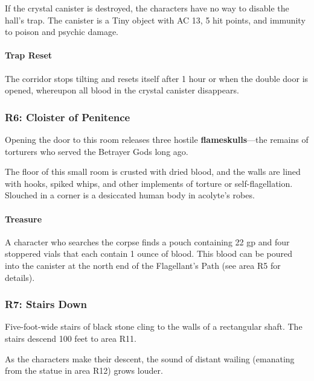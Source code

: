 \documentclass[letterpaper, 11pt, bg=full, twocolumn]{dndbook}
\begin{document}
If the crystal canister is destroyed, the characters have no way to disable the hall's trap. The canister is a Tiny object with AC 13, 5 hit points, and immunity to poison and psychic damage.

\paragraph{Trap Reset}

The corridor stops tilting and resets itself after 1 hour or when the double door is opened, whereupon all blood in the crystal canister disappears.

\subsubsection{R6: Cloister of Penitence}

Opening the door to this room releases three hostile \textbf{flameskulls}---the remains of torturers who served the Betrayer Gods long ago.


\begin{DndReadAloud}
The floor of this small room is crusted with dried blood, and the walls are lined with hooks, spiked whips, and other implements of torture or self-flagellation. Slouched in a corner is a desiccated human body in acolyte's robes.
\end{DndReadAloud}

\paragraph{Treasure}

A character who searches the corpse finds a pouch containing 22 gp and four stoppered vials that each contain 1 ounce of blood. This blood can be poured into the canister at the north end of the Flagellant's Path (see area R5 for details).

\subsubsection{R7: Stairs Down}

Five-foot-wide stairs of black stone cling to the walls of a rectangular shaft. The stairs descend 100 feet to area R11.

As the characters make their descent, the sound of distant wailing (emanating from the statue in area R12) grows louder.
\end{document}
